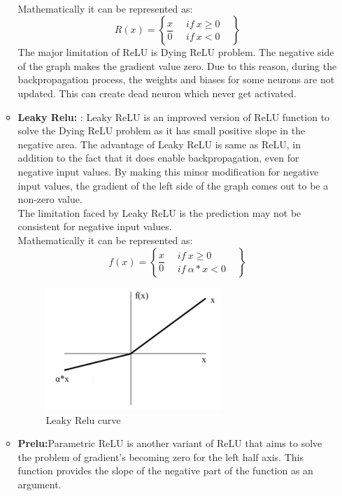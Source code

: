 \begin{enumerate}
\begin{itemize}
\begin{figure}[ht]
            \end{figure} \\
            Mathematically it can be represented as:
            $$R(x) =\left \{\frac{x}{0} \ \ \ \ \begin{matrix}
                if \ x\geq 0 & \\ if \ x < 0
                & 
               \end{matrix} \right\}$$
               The major limitation of ReLU is Dying ReLU problem. The negative side of the graph makes the gradient value zero. Due to this reason, during the backpropagation process, the weights and biases for some neurons are not updated. This can create dead neuron which never get activated.
            \item {\bf Leaky Relu:} : Leaky ReLU is an improved version of ReLU function to solve the Dying ReLU  problem as it has small positive slope in the negative area. The advantage of Leaky ReLU is same as ReLU, in addition to the fact that it does enable backpropagation, even for negative input values. By making this minor modification for negative input values, the gradient of the left side of the graph comes out to be a non-zero value.\\
            The limitation faced by Leaky ReLU is the prediction may not be consistent for negative input values.\\
            Mathematically it can be represented as:
            $$f(x) =\left \{\frac{x}{0} \ \ \ \ \begin{matrix}
                if \ x\geq 0 & \\ if \ \alpha * x < 0
                & 
               \end{matrix} \right\}$$
            \begin{figure}[ht]
                \centering
                \includegraphics[width=2.6in]{./figures/leakyrelucurve.png}
                \caption{Leaky Relu curve}
            \end{figure}
            \item {\bf Prelu:}Parametric ReLU is another variant of ReLU that aims to solve the problem of gradient’s becoming zero for the left half axis. This function provides the slope of the negative part of the function as an argument. 

\end{itemize}
\end{enumerate}
